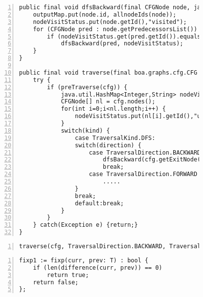 \begin{figure}[ht!]
\begin{lstlisting}[numbers=left, tabsize=4, escapechar=@, caption={Implementation code of traversal without fixpoint.},label={lst:allNodeids}] 
public final void dfsBackward(final CFGNode node, java.util.HashMap<Integer,String> nodeVisitStatus) throws Exception {
	outputMap.put(node.id, allnodeIds(node));
	nodeVisitStatus.put(node.getId(),"visited");
	for (CFGNode pred : node.getPredecessorsList()) {
		if (nodeVisitStatus.get(pred.getId()).equals("unvisited"))
			dfsBackward(pred, nodeVisitStatus);
	}
}

public final void traverse(final boa.graphs.cfg.CFG cfg, final Traversal.TraversalDirection direction, final Traversal.TraversalKind kind) throws Exception {
	try {
		if (preTraverse(cfg)) {			
			java.util.HashMap<Integer,String> nodeVisitStatus=new java.util.HashMap<Integer,String>();
			CFGNode[] nl = cfg.nodes();
			for(int i=0;i<nl.length;i++) {
				nodeVisitStatus.put(nl[i].getId(),"unvisited");
			}
			switch(kind) {
				case TraversalKind.DFS:
				switch(direction) {
					case TraversalDirection.BACKWARD :
						dfsBackward(cfg.getExitNode(), nodeVisitStatus);
						break;
					case TraversalDirection.FORWARD :
						.....
				}
				break;					
				default:break;
			}
		}
	} catch(Exception e) {return;}
}
\end{lstlisting}

\begin{lstlisting}[numbers=left, tabsize=4, escapechar=@, caption={Traverse call with fixpoint function.},label={lst:cfgPdom-traverse}] 
traverse(cfg, TraversalDirection.BACKWARD, TraversalKind.POSTORDER, cfgPdom, fixp1);
\end{lstlisting}

\begin{lstlisting}[numbers=left, tabsize=4, escapechar=@, caption={User defined fixpoint function.},label={lst:fixp-imp}] 
fixp1 := fixp(curr, prev: T) : bool {
	if (len(difference(curr, prev)) == 0)
		return true;	
	return false;
};
\end{lstlisting}
\end{figure}



